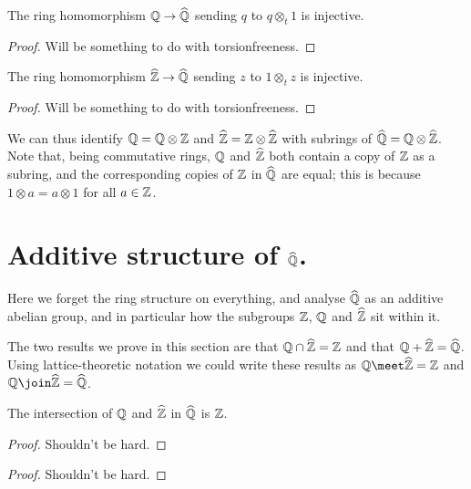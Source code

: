 \begin{lemma}\label{Qhat.injective_Rat}\notready The ring homomorphism $\mathbb{Q}\to\widehat{\mathbb{Q}}$ sending $q$ to $q\otimes_t 1$
    is injective.
\end{lemma}
\begin{proof} Will be something to do with torsionfreeness.
\end{proof}

\begin{lemma}\label{Qhat.injective_ZHat}\notready The ring homomorphism $\widehat{\mathbb{Z}}\to\widehat{\mathbb{Q}}$ sending 
    $z$ to $1\otimes_t z$ is injective.
\end{lemma}
\begin{proof} Will be something to do with torsionfreeness.
\end{proof}

We can thus identify $\mathbb{Q}=\mathbb{Q}\otimes\mathbb{Z}$ and $\widehat{\mathbb{Z}}=\mathbb{Z}\otimes\widehat{\mathbb{Z}}$ with subrings of $\widehat{\mathbb{Q}}=\mathbb{Q}\otimes\widehat{\mathbb{Z}}$.
Note that, being commutative rings, $\mathbb{Q}$ and $\widehat{\mathbb{Z}}$ both contain a copy of $\mathbb{Z}$ as a subring, and
the corresponding copies of $\mathbb{Z}$ in $\widehat{\mathbb{Q}}$ are equal; this is because $1\otimes a=a\otimes 1$
for all $a\in\mathbb{Z}$.

\section{Additive structure of $\widehat{\mathbb{Q}}$.}

Here we forget the ring structure on everything, and analyse $\widehat{\mathbb{Q}}$ as an additive
abelian group, and in particular how the subgroups $\mathbb{Z}$, $\mathbb{Q}$ and $\widehat{\mathbb{Z}}$ sit within it.

The two results we prove in this section are that $\mathbb{Q}\cap\widehat{\mathbb{Z}}=\mathbb{Z}$ and that $\mathbb{Q}+\widehat{\mathbb{Z}}=\widehat{\mathbb{Q}}$.
Using lattice-theoretic notation we could write these results as $\Q\meet\Zhat=\Z$ and
$\Q\join\Zhat=\Qhat$.

\begin{lemma}\label{Qhat.rat_meet_zHat} The intersection of $\mathbb{Q}$ and $\widehat{\mathbb{Z}}$ in $\widehat{\mathbb{Q}}$ is $\mathbb{Z}$.
\end{lemma}
\begin{proof}
    Shouldn't be hard.
\end{proof}

\begin{proof}
    Shouldn't be hard.
\end{proof}



